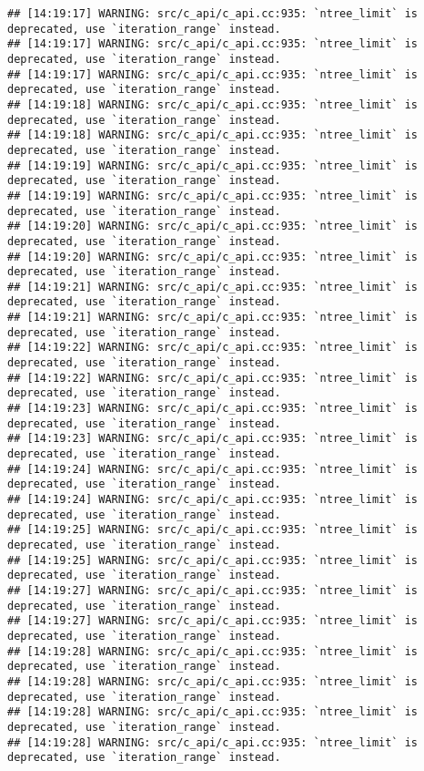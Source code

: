 \documentclass[
]{article}
\begin{document}
\begin{verbatim}
## [14:19:17] WARNING: src/c_api/c_api.cc:935: `ntree_limit` is deprecated, use `iteration_range` instead.
## [14:19:17] WARNING: src/c_api/c_api.cc:935: `ntree_limit` is deprecated, use `iteration_range` instead.
## [14:19:17] WARNING: src/c_api/c_api.cc:935: `ntree_limit` is deprecated, use `iteration_range` instead.
## [14:19:18] WARNING: src/c_api/c_api.cc:935: `ntree_limit` is deprecated, use `iteration_range` instead.
## [14:19:18] WARNING: src/c_api/c_api.cc:935: `ntree_limit` is deprecated, use `iteration_range` instead.
## [14:19:19] WARNING: src/c_api/c_api.cc:935: `ntree_limit` is deprecated, use `iteration_range` instead.
## [14:19:19] WARNING: src/c_api/c_api.cc:935: `ntree_limit` is deprecated, use `iteration_range` instead.
## [14:19:20] WARNING: src/c_api/c_api.cc:935: `ntree_limit` is deprecated, use `iteration_range` instead.
## [14:19:20] WARNING: src/c_api/c_api.cc:935: `ntree_limit` is deprecated, use `iteration_range` instead.
## [14:19:21] WARNING: src/c_api/c_api.cc:935: `ntree_limit` is deprecated, use `iteration_range` instead.
## [14:19:21] WARNING: src/c_api/c_api.cc:935: `ntree_limit` is deprecated, use `iteration_range` instead.
## [14:19:22] WARNING: src/c_api/c_api.cc:935: `ntree_limit` is deprecated, use `iteration_range` instead.
## [14:19:22] WARNING: src/c_api/c_api.cc:935: `ntree_limit` is deprecated, use `iteration_range` instead.
## [14:19:23] WARNING: src/c_api/c_api.cc:935: `ntree_limit` is deprecated, use `iteration_range` instead.
## [14:19:23] WARNING: src/c_api/c_api.cc:935: `ntree_limit` is deprecated, use `iteration_range` instead.
## [14:19:24] WARNING: src/c_api/c_api.cc:935: `ntree_limit` is deprecated, use `iteration_range` instead.
## [14:19:24] WARNING: src/c_api/c_api.cc:935: `ntree_limit` is deprecated, use `iteration_range` instead.
## [14:19:25] WARNING: src/c_api/c_api.cc:935: `ntree_limit` is deprecated, use `iteration_range` instead.
## [14:19:25] WARNING: src/c_api/c_api.cc:935: `ntree_limit` is deprecated, use `iteration_range` instead.
## [14:19:27] WARNING: src/c_api/c_api.cc:935: `ntree_limit` is deprecated, use `iteration_range` instead.
## [14:19:27] WARNING: src/c_api/c_api.cc:935: `ntree_limit` is deprecated, use `iteration_range` instead.
## [14:19:28] WARNING: src/c_api/c_api.cc:935: `ntree_limit` is deprecated, use `iteration_range` instead.
## [14:19:28] WARNING: src/c_api/c_api.cc:935: `ntree_limit` is deprecated, use `iteration_range` instead.
## [14:19:28] WARNING: src/c_api/c_api.cc:935: `ntree_limit` is deprecated, use `iteration_range` instead.
## [14:19:28] WARNING: src/c_api/c_api.cc:935: `ntree_limit` is deprecated, use `iteration_range` instead.

\end{verbatim}
\end{document}
